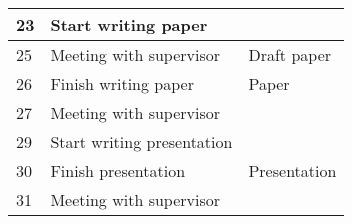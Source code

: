 \documentclass[a4paper, oneside]{scrartcl}
\begin{document}
\begin{center}
\begin{longtable}{lll}
23  & Start writing paper                             &                         \\ \midrule
25  & Meeting with supervisor                         & Draft paper             \\ \midrule
26  & Finish writing paper                            & Paper                   \\ \midrule
27  & Meeting with supervisor                         &                         \\ \midrule
29  & Start writing presentation                      &                         \\ \midrule
30  & Finish presentation                             & Presentation            \\ \midrule
31  & Meeting with supervisor                         &                         \\ \bottomrule
\end{longtable}
\end{center}

\nocite{*}


\end{document}
